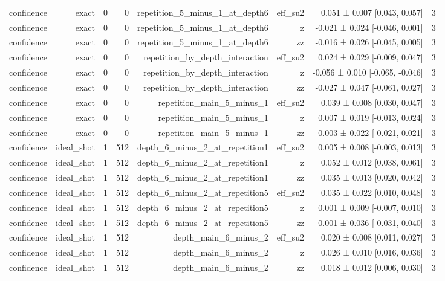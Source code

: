 \begin{table}
\begin{tabular}{lrrrrrrr}
confidence & exact & 0 & 0 & repetition\_5\_minus\_1\_at\_depth6 & eff\_su2 & 0.051 ± 0.007 [0.043, 0.057] & 3 \\
confidence & exact & 0 & 0 & repetition\_5\_minus\_1\_at\_depth6 & z & -0.021 ± 0.024 [-0.046, 0.001] & 3 \\
confidence & exact & 0 & 0 & repetition\_5\_minus\_1\_at\_depth6 & zz & -0.016 ± 0.026 [-0.045, 0.005] & 3 \\
confidence & exact & 0 & 0 & repetition\_by\_depth\_interaction & eff\_su2 & 0.024 ± 0.029 [-0.009, 0.047] & 3 \\
confidence & exact & 0 & 0 & repetition\_by\_depth\_interaction & z & -0.056 ± 0.010 [-0.065, -0.046] & 3 \\
confidence & exact & 0 & 0 & repetition\_by\_depth\_interaction & zz & -0.027 ± 0.047 [-0.061, 0.027] & 3 \\
confidence & exact & 0 & 0 & repetition\_main\_5\_minus\_1 & eff\_su2 & 0.039 ± 0.008 [0.030, 0.047] & 3 \\
confidence & exact & 0 & 0 & repetition\_main\_5\_minus\_1 & z & 0.007 ± 0.019 [-0.013, 0.024] & 3 \\
confidence & exact & 0 & 0 & repetition\_main\_5\_minus\_1 & zz & -0.003 ± 0.022 [-0.021, 0.021] & 3 \\
confidence & ideal\_shot & 1 & 512 & depth\_6\_minus\_2\_at\_repetition1 & eff\_su2 & 0.005 ± 0.008 [-0.003, 0.013] & 3 \\
confidence & ideal\_shot & 1 & 512 & depth\_6\_minus\_2\_at\_repetition1 & z & 0.052 ± 0.012 [0.038, 0.061] & 3 \\
confidence & ideal\_shot & 1 & 512 & depth\_6\_minus\_2\_at\_repetition1 & zz & 0.035 ± 0.013 [0.020, 0.042] & 3 \\
confidence & ideal\_shot & 1 & 512 & depth\_6\_minus\_2\_at\_repetition5 & eff\_su2 & 0.035 ± 0.022 [0.010, 0.048] & 3 \\
confidence & ideal\_shot & 1 & 512 & depth\_6\_minus\_2\_at\_repetition5 & z & 0.001 ± 0.009 [-0.007, 0.010] & 3 \\
confidence & ideal\_shot & 1 & 512 & depth\_6\_minus\_2\_at\_repetition5 & zz & 0.001 ± 0.036 [-0.031, 0.040] & 3 \\
confidence & ideal\_shot & 1 & 512 & depth\_main\_6\_minus\_2 & eff\_su2 & 0.020 ± 0.008 [0.011, 0.027] & 3 \\
confidence & ideal\_shot & 1 & 512 & depth\_main\_6\_minus\_2 & z & 0.026 ± 0.010 [0.016, 0.036] & 3 \\
confidence & ideal\_shot & 1 & 512 & depth\_main\_6\_minus\_2 & zz & 0.018 ± 0.012 [0.006, 0.030] & 3 \\

\end{tabular}
\end{table}
